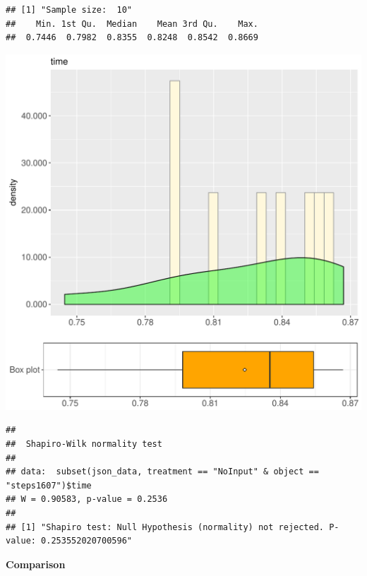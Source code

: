 \documentclass{article}\usepackage[]{graphicx}\usepackage[]{color}
\makeatletter
\def\maxwidth{ %
  \ifdim\Gin@nat@width>\linewidth
    \linewidth
  \else
    \Gin@nat@width
  \fi
}
\newenvironment{kframe}{%
 \def\at@end@of@kframe{}%
 \ifinner\ifhmode%
  \def\at@end@of@kframe{\end{minipage}}%
  \begin{minipage}{\columnwidth}%
 \fi\fi%
 \def\FrameCommand##1{\hskip\@totalleftmargin \hskip-\fboxsep
 \colorbox{shadecolor}{##1}\hskip-\fboxsep
     \hskip-\linewidth \hskip-\@totalleftmargin \hskip\columnwidth}%
 \MakeFramed {\advance\hsize-\width
   \@totalleftmargin\z@ \linewidth\hsize
   \@setminipage}}%
 {\par\unskip\endMakeFramed%
 \at@end@of@kframe}
\newenvironment{knitrout}{}{} %
\makeatother
\begin{document}
\begin{knitrout}
\color{fgcolor}\begin{kframe}
\begin{verbatim}
## [1] "Sample size:  10"
##    Min. 1st Qu.  Median    Mean 3rd Qu.    Max. 
##  0.7446  0.7982  0.8355  0.8248  0.8542  0.8669
\end{verbatim}
\end{kframe}
\includegraphics[width=\maxwidth]{figure/RH4_NoInput_steps1607-1} 
\begin{kframe}\begin{verbatim}
## 
## 	Shapiro-Wilk normality test
## 
## data:  subset(json_data, treatment == "NoInput" & object == "steps1607")$time
## W = 0.90583, p-value = 0.2536
## 
## [1] "Shapiro test: Null Hypothesis (normality) not rejected. P-value: 0.253552020700596"
\end{verbatim}
\end{kframe}
\end{knitrout}
  
 \textbf{Comparison}
  
\end{document}
